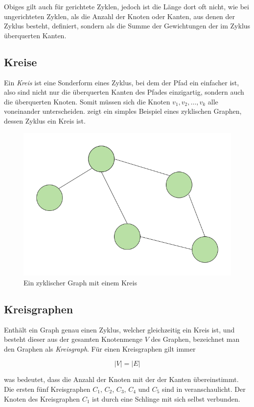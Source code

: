             Obiges gilt auch für gerichtete Zyklen, jedoch ist die Länge dort oft nicht, wie bei ungerichteten Zyklen, als die Anzahl der Knoten oder Kanten, aus denen der Zyklus besteht, definiert, sondern als die Summe der Gewichtungen der im Zyklus überquerten Kanten. \cite{EZ:Web16, EZ:Web17}

        \subsection{Kreise}
        
            Ein \emph{Kreis} ist eine Sonderform eines Zyklus, bei dem der Pfad ein einfacher ist, also sind nicht nur die überquerten Kanten des Pfades einzigartig, sondern auch die überquerten Knoten. Somit müssen sich die Knoten $v_1, v_2, \ldots, v_k$ alle voneinander unterscheiden.  zeigt ein simples Beispiel eines zyklischen Graphen, dessen Zyklus ein Kreis ist. \cite{EZ:Web13}

            \begin{figure}
                \centering
                \includegraphics[width=0.5\linewidth]{images/cyclic-graph.png}
                \caption{Ein zyklischer Graph mit einem Kreis\\\cite{EZ:Web12}}
                \label{fig:cyclic-graph}
            \end{figure}

        \subsection{Kreisgraphen}

            Enthält ein Graph genau einen Zyklus, welcher gleichzeitig ein Kreis ist, und besteht dieser aus der gesamten Knotenmenge $V$ des Graphen, bezeichnet man den Graphen als \emph{Kreisgraph}. Für einen Kreisgraphen gilt immer
            
                \[|V| = |E|\]
            
            was bedeutet, dass die Anzahl der Knoten mit der der Kanten übereinstimmt. Die ersten fünf Kreisgraphen $C_1$, $C_2$, $C_3$, $C_4$ und $C_5$ sind in  veranschaulicht. Der Knoten des Kreisgraphen $C_1$ ist durch eine Schlinge mit sich selbst verbunden. \cite{EZ:Web14, EZ:Web15}

